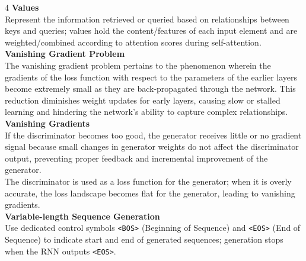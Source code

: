 \documentclass[8pt]{extarticle}
\begin{document}
\begin{multicols}{4}
{\vspace{2pt}\textbf{Values}\\
Represent the information retrieved or queried based on relationships between keys and queries; values hold the content/features of each input element and are weighted/combined according to attention scores during self-attention.\\
\vspace{2pt}\textbf{Vanishing Gradient Problem}\\
The vanishing gradient problem pertains to the phenomenon wherein the gradients of the loss function with respect to the parameters of the earlier layers become extremely small as they are back-propagated through the network. This reduction diminishes weight updates for early layers, causing slow or stalled learning and hindering the network's ability to capture complex relationships.\\
\vspace{2pt}\textbf{Vanishing Gradients}\\
If the discriminator becomes too good, the generator receives little or no gradient signal because small changes in generator weights do not affect the discriminator output, preventing proper feedback and incremental improvement of the generator.\\
The discriminator is used as a loss function for the generator; when it is overly accurate, the loss landscape becomes flat for the generator, leading to vanishing gradients.\\
\vspace{2pt}\textbf{Variable-length Sequence Generation}\\
Use dedicated control symbols \texttt{<BOS>} (Beginning of Sequence) and \texttt{<EOS>} (End of Sequence) to indicate start and end of generated sequences; generation stops when the RNN outputs \texttt{<EOS>}.\\

}
\end{multicols}
\end{document}
